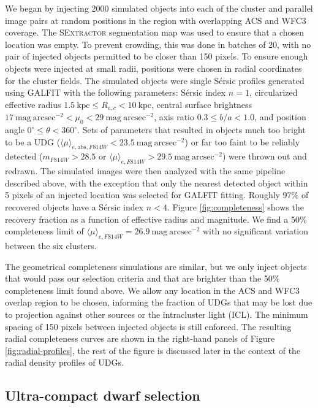 \documentclass[iop,tighten,twocolumn,apj,floatfix]{emulateapj}
\begin{document}
We began by injecting 2000 simulated objects into each of the cluster and
parallel image pairs at random positions in the region with overlapping ACS
and WFC3 coverage. 
The \textsc{SExtractor} segmentation map was used to ensure that a chosen location
was empty.
To prevent crowding, this was done in batches of 20, with no pair of injected
objects permitted to be closer than 150 pixels.
To ensure enough objects were injected at small radii, positions were
chosen in radial coordinates for the cluster fields.
The simulated objects were single S\'{e}rsic profiles generated using
\textsc{GALFIT} with the following parameters: S\'{e}rsic index $n = 1$,
circularized effective radius $1.5~\mathrm{kpc} \leq R_{e,c} < 10~\mathrm{kpc}$, central surface brightness
$17~\mathrm{mag}~\mathrm{arcsec}^{-2} < \mu_0 < 29~\mathrm{mag}~\mathrm{arcsec}^{-2}$, axis ratio $0.3 \leq
b/a < 1.0$, and position angle $0^{\circ} \leq \theta < 360^{\circ}$.  Sets of parameters that
resulted in objects much too bright to be a UDG
($\langle\mu\rangle_{e,\mathrm{abs},F814W} <
23.5~\mathrm{mag}~\mathrm{arcsec}^{-2}$) or far too faint to be reliably
detected ($m_{F814W} > 28.5$ or $\langle\mu\rangle_{e,F814W} >
29.5~\mathrm{mag}~\mathrm{arcsec}^{-2}$) were thrown out and redrawn.
The simulated images were then analyzed with the same pipeline described
above, with the exception that only the nearest detected object within 5
pixels of an injected location was selected for \textsc{GALFIT} fitting. Roughly 97\%
of recovered objects have a S\'{e}rsic index $n < 4$.
Figure \ref{fig:completeness} shows the recovery fraction as a function of
effective radius and magnitude. We find a 50\% completeness limit of
$\langle\mu\rangle_{e,F814W} = 26.9~\mathrm{mag}~\mathrm{arcsec}^{-2}$ with no
significant variation between the six clusters.

The geometrical completeness simulations are similar, but we only inject objects
that would pass our selection criteria and that are brighter than the 50\%
completeness limit found above. We allow any location in the
ACS and WFC3 overlap region to be chosen, informing the fraction of UDGs that may
be lost due to projection against other sources or the intracluster light
(ICL). The minimum spacing of 150
pixels between injected objects is still enforced. The resulting radial
completeness curves are shown in the right-hand panels of Figure
\ref{fig:radial-profiles}, the rest of the figure is discussed later in the
context of the radial density profiles of UDGs.

\subsection{Ultra-compact dwarf selection}
\end{document}
